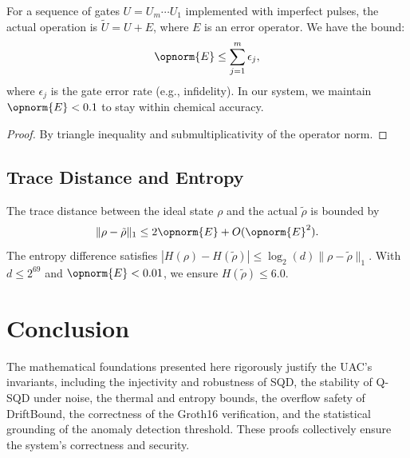 \documentclass[11pt,a4paper]{article}
\theoremstyle{plain}
\begin{document}
For a sequence of gates $U = U_m \cdots U_1$ implemented with imperfect pulses, the actual operation is $\tilde{U} = U + E$, where $E$ is an error operator. We have the bound:
\[
\opnorm{E} \leq \sum_{j=1}^m \epsilon_j,
\]
where $\epsilon_j$ is the gate error rate (e.g., infidelity). In our system, we maintain $\opnorm{E} < 0.1$ to stay within chemical accuracy.

\begin{proof}
By triangle inequality and submultiplicativity of the operator norm.
\end{proof}

\subsection{Trace Distance and Entropy}

The trace distance between the ideal state $\rho$ and the actual $\tilde{\rho}$ is bounded by
\[
\|\rho - \tilde{\rho}\|_1 \leq 2 \opnorm{E} + O(\opnorm{E}^2).
\]
The entropy difference satisfies $|H(\rho) - H(\tilde{\rho})| \leq \log_2(d) \|\rho - \tilde{\rho}\|_1$. With $d \leq 2^{69}$ and $\opnorm{E} < 0.01$, we ensure $H(\tilde{\rho}) \leq 6.0$.

\section{Conclusion}

The mathematical foundations presented here rigorously justify the UAC's invariants, including the injectivity and robustness of SQD, the stability of Q-SQD under noise, the thermal and entropy bounds, the overflow safety of DriftBound, the correctness of the Groth16 verification, and the statistical grounding of the anomaly detection threshold. These proofs collectively ensure the system's correctness and security.

\nocite{*}


\clearpage 
\end{document}
